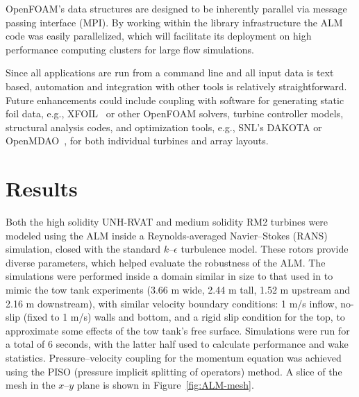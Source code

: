 \documentclass[times]{weauth}
\begin{document}
OpenFOAM's data structures are designed to be inherently parallel via message
passing interface (MPI). By working within the library infrastructure the ALM
code was easily parallelized, which will facilitate its deployment on high
performance computing clusters for large flow simulations.

Since all applications are run from a command line and all input data is text
based, automation and integration with other tools is relatively
straightforward. Future enhancements could include coupling with software for
generating static foil data, e.g., XFOIL~\cite{Drela1989} or other OpenFOAM
solvers, turbine controller models, structural analysis codes, and optimization
tools, e.g., SNL's DAKOTA \cite{AdamsBaumanBohnhoffEtAl2009} or
OpenMDAO~\cite{Gray2010}, for both individual turbines and array layouts.


\section{Results}

Both the high solidity UNH-RVAT and medium solidity RM2 turbines were modeled
using the ALM inside a Reynolds-averaged Navier--Stokes (RANS) simulation,
closed with the standard $k$--$\epsilon$ turbulence model. These rotors provide
diverse parameters, which helped evaluate the robustness of the ALM. The
simulations were performed inside a domain similar in size to that used in
\cite{Bachant2016-BR-CFD} to mimic the tow tank experiments (3.66 m wide, 2.44 m
tall, 1.52 m upstream and 2.16 m downstream), with similar velocity boundary
conditions: 1 m/s inflow, no-slip (fixed to 1 m/s) walls and bottom, and a rigid
slip condition for the top, to approximate some effects of the tow tank's free
surface. Simulations were run for a total of 6 seconds, with the latter half
used to calculate performance and wake statistics. Pressure--velocity coupling
for the momentum equation was achieved using the PISO (pressure implicit
splitting of operators) method. A slice of the mesh in the $x$--$y$ plane is
shown in Figure~\ref{fig:ALM-mesh}.
\end{document}
